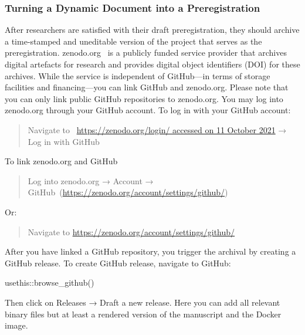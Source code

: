 \documentclass[psych,tutorial,accept,moreauthors,pdftex]{Definitions/mdpi}
\newenvironment{Shaded}{\begin{snugshade}}{\end{snugshade}}
\newcommand{\FunctionTok}[1]{\textcolor[rgb]{0.00,0.00,0.00}{#1}}
\newcommand{\NormalTok}[1]{#1}
\newcommand{\SpecialCharTok}[1]{\textcolor[rgb]{0.00,0.00,0.00}{#1}}
\begin{document}
\begin{paracol}{2}
\subsubsection*{Turning a Dynamic Document into a
Preregistration}\label{turning-a-dynamic-document-into-a-preregistration}

After researchers are satisfied with their draft preregistration, they
should archive a time-stamped and uneditable version of the project that
serves as the preregistration. zenodo.org~\citep{zenodo} is a publicly
funded service provider that archives digital artefacts for research and
provides digital object identifiers (DOI) for these archives. While the
service is independent of GitHub---in terms of storage facilities and
financing---you can link GitHub and zenodo.org. Please note that you can
only link public GitHub repositories to zenodo.org. You may log into
zenodo.org through your GitHub account. To log in with your GitHub
account:

\begin{quote}
{Navigate to}
~\url{https://zenodo.org/login/ accessed on 11 October 2021} → Log in with GitHub
\end{quote}

\noindent{}To link zenodo.org and GitHub

\begin{quote}
Log into zenodo.org → Account → {GitHub}~({\url{https://zenodo.org/account/settings/github/}})
\end{quote}

\noindent{}Or:

\begin{quote}
{Navigate to}
 \url{https://zenodo.org/account/settings/github/}
\end{quote}

After you have linked a GitHub repository, you trigger the archival by
creating a GitHub release. To create GitHub release, navigate to GitHub:

\begin{adjustwidth}{0.5cm}{0cm} 
\begin{Shaded}
\begin{Highlighting}[]
\NormalTok{usethis}\SpecialCharTok{::}\FunctionTok{browse\_github}\NormalTok{()}
\end{Highlighting}
\end{Shaded}
\end{adjustwidth}

Then click on Releases → Draft a new release. Here you can add all
relevant binary files but at least a rendered version of the manuscript
and the Docker image.


\end{paracol}
\end{document}
